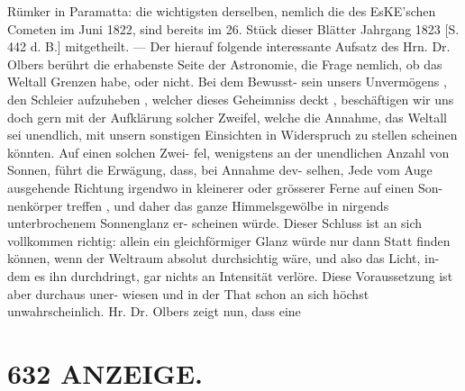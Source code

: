 \documentclass[12pt,a4paper]{article}
\begin{document}
{{{{{{{{Rümker  in  Paramatta:  die  wichtigsten  derselben,  nemlich  die  des EsKE'schen  Cometen  im  Juni  1822,  sind  bereits  im  26.  Stück  dieser  Blätter  Jahrgang  1823  [S.  442  d.  B.] mitgetheilt.  ---  Der  hierauf  folgende  interessante  Aufsatz  des  Hrn.  Dr.  Olbers  berührt  die  erhabenste Seite  der  Astronomie,  die  Frage  nemlich,  ob  das  Weltall  Grenzen  habe,  oder  nicht.  Bei  dem  Bewusst- sein  unsers  Unvermögens ,  den  Schleier  aufzuheben ,  welcher  dieses  Geheimniss  deckt ,  beschäftigen  wir uns  doch  gern  mit  der  Aufklärung  solcher  Zweifel,  welche  die  Annahme,  das  Weltall  sei  unendlich, mit  unsern  sonstigen  Einsichten  in  Widerspruch  zu  stellen  scheinen  könnten.  Auf  einen  solchen  Zwei- fel, wenigstens  an  der  unendlichen  Anzahl  von  Sonnen,  führt  die  Erwägung,  dass,  bei  Annahme  dev- selhen,  Jede  vom  Auge  ausgehende  Richtung  irgendwo  in  kleinerer  oder  grösserer  Ferne  auf  einen  Son- nenkörper treffen ,  und  daher  das  ganze  Himmelsgewölbe  in  nirgends  unterbrochenem  Sonnenglanz  er- scheinen würde.  Dieser  Schluss  ist  an  sich  vollkommen  richtig:  allein  ein  gleichförmiger  Glanz  würde nur  dann  Statt  finden  können,  wenn  der  Weltraum  absolut  durchsichtig  wäre,  und  also  das  Licht,  in- dem es  ihn  durchdringt,  gar  nichts  an  Intensität  verlöre.  Diese  Voraussetzung  ist  aber  durchaus  uner- wiesen und  in  der  That  schon  an  sich  höchst  unwahrscheinlich.     Hr.  Dr.  Olbers   zeigt  nun,    dass  eine


\section*{632  ANZEIGE.}

}}}}}}}}
\end{document}
